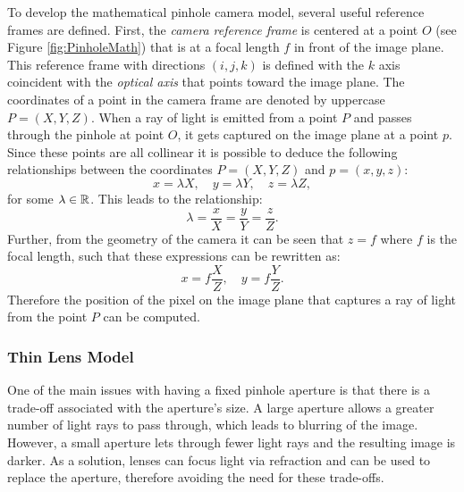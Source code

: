 To develop the mathematical pinhole camera model, several useful reference frames are defined. First, the \textit{camera reference frame} is centered at a point $O$ (see Figure \ref{fig:PinholeMath}) that is at a focal length $f$ in front of the image plane. This reference frame with directions $(i,j,k)$ is defined with the $k$ axis coincident with the \textit{optical axis} that points toward the image plane. The coordinates of a point in the camera frame are denoted by uppercase $P = (X,Y,Z)$. When a ray of light is emitted from a point $P$ and passes through the pinhole at point $O$, it gets captured on the image plane at a point $p$. Since these points are all collinear it is possible to deduce the following relationships between the coordinates $P = (X,Y,Z)$ and $p = (x,y,z)$:
\begin{equation*}
x = \lambda X, \quad y = \lambda Y, \quad z = \lambda Z,
\end{equation*}
for some $\lambda \in \mathbb{R}$. This leads to the relationship:
\begin{equation*}
\lambda = \frac{x}{X}= \frac{y}{Y}= \frac{z}{Z}.
\end{equation*}
Further, from the geometry of the camera it can be seen that $z = f$ where $f$ is the focal length, such that these expressions can be rewritten as:
\begin{equation} \label{eq:pinhole}
    x=f\frac{X}{Z}, \quad  y = f\frac{Y}{Z}.
\end{equation}
Therefore the position of the pixel on the image plane that captures a ray of light from the point $P$ can be computed.

\subsubsection{Thin Lens Model}
One of the main issues with having a fixed pinhole aperture is that there is a trade-off associated with the aperture's size. A large aperture allows a greater number of light rays to pass through, which leads to blurring of the image. However, a small aperture lets through fewer light rays and the resulting image is darker. As a solution, lenses can focus light via refraction and can be used to replace the aperture, therefore avoiding the need for these trade-offs. 


